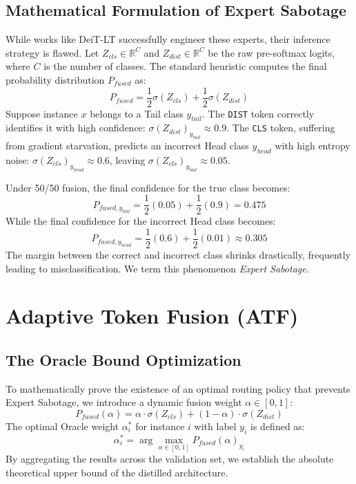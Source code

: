 \documentclass[10pt,twocolumn,letterpaper]{article}
\begin{document}
\subsection{Mathematical Formulation of Expert Sabotage}
While works like DeiT-LT successfully engineer these experts, their inference strategy is flawed. Let $Z_{cls} \in \mathbb{R}^C$ and $Z_{dist} \in \mathbb{R}^C$ be the raw pre-softmax logits, where $C$ is the number of classes. The standard heuristic computes the final probability distribution $P_{fused}$ as:
\begin{equation}
    P_{fused} = \frac{1}{2}\sigma(Z_{cls}) + \frac{1}{2}\sigma(Z_{dist})
\end{equation}
Suppose instance $x$ belongs to a Tail class $y_{tail}$. The \texttt{DIST} token correctly identifies it with high confidence: $\sigma(Z_{dist})_{y_{tail}} \approx 0.9$. The \texttt{CLS} token, suffering from gradient starvation, predicts an incorrect Head class $y_{head}$ with high entropy noise: $\sigma(Z_{cls})_{y_{head}} \approx 0.6$, leaving $\sigma(Z_{cls})_{y_{tail}} \approx 0.05$.

Under 50/50 fusion, the final confidence for the true class becomes:
\begin{equation}
    P_{fused, y_{tail}} = \frac{1}{2}(0.05) + \frac{1}{2}(0.9) = 0.475
\end{equation}
While the final confidence for the incorrect Head class becomes:
\begin{equation}
    P_{fused, y_{head}} = \frac{1}{2}(0.6) + \frac{1}{2}(0.01) \approx 0.305
\end{equation}
The margin between the correct and incorrect class shrinks drastically, frequently leading to misclassification. We term this phenomenon \textit{Expert Sabotage}.

\section{Adaptive Token Fusion (ATF)}

\subsection{The Oracle Bound Optimization}
To mathematically prove the existence of an optimal routing policy that prevents Expert Sabotage, we introduce a dynamic fusion weight $\alpha \in [0, 1]$:
\begin{equation}
    P_{fused}(\alpha) = \alpha \cdot \sigma(Z_{cls}) + (1 - \alpha) \cdot \sigma(Z_{dist})
\end{equation}
The optimal Oracle weight $\alpha_i^*$ for instance $i$ with label $y_i$ is defined as:
\begin{equation}
    \alpha_i^* = \arg\max_{\alpha \in [0,1]} P_{fused}(\alpha)_{y_i}
\end{equation}
By aggregating the results across the validation set, we establish the absolute theoretical upper bound of the distilled architecture.
\end{document}
